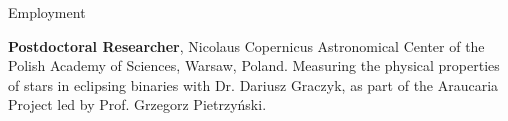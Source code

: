 \begin{rubric}{Employment}

\entry*[2023 -- ~~~~~\,\,\,~~~]%
    \textbf{Postdoctoral Researcher}, Nicolaus Copernicus Astronomical Center of the Polish Academy of Sciences, Warsaw, Poland. Measuring the physical properties of stars in eclipsing binaries with Dr. Dariusz Graczyk, as part of the Araucaria Project led by Prof. Grzegorz Pietrzy\'{n}ski. 

    
\end{rubric}